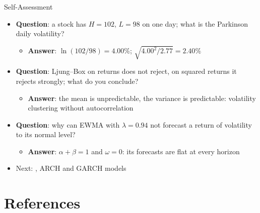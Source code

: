 \begin{frame}{Self-Assessment}
\itemsize{\small}
\begin{itemize}
    \item \textbf{Question}: a stock has $H = 102$, $L = 98$ on one day; what is the Parkinson daily volatility?
    \begin{itemize}
        \item \textbf{Answer}: $\ln(102/98) = 4.00\%$; $\sqrt{4.00^2/2.77} = 2.40\%$
    \end{itemize}
    \item \textbf{Question}: Ljung--Box on returns does not reject, on squared returns it rejects strongly; what do you conclude?
    \begin{itemize}
        \item \textbf{Answer}: the mean is unpredictable, the variance is predictable: volatility clustering without autocorrelation
    \end{itemize}
    \item \textbf{Question}: why can EWMA with $\lambda = 0.94$ not forecast a return of volatility to its normal level?
    \begin{itemize}
        \item \textbf{Answer}: $\alpha + \beta = 1$ and $\omega = 0$: its forecasts are flat at every horizon
    \end{itemize}
    \item Next: , ARCH and GARCH models
\end{itemize}
\end{frame}


\section{References}

